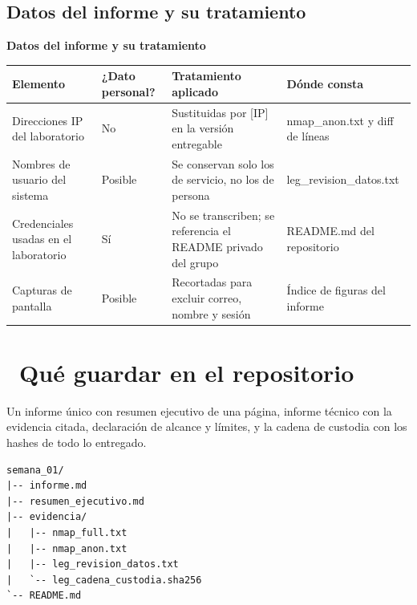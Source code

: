 \documentclass[11pt,a4paper]{article}
\newcommand{\iconotexto}[2]{\textcolor{cyanNeon}{\faIcon{#1}}~#2}
\begin{document}
\subsection{Datos del informe y su tratamiento}

\begin{center}
\begin{minipage}{\linewidth}
\centering
{\footnotesize
\textbf{Datos del informe y su tratamiento}\par\smallskip
\begin{tabular}{@{}>{\raggedright\arraybackslash}p{3.55cm}>{\raggedright\arraybackslash}p{3.55cm}>{\raggedright\arraybackslash}p{3.55cm}>{\raggedright\arraybackslash}p{3.55cm}@{}}
\toprule
\textbf{Elemento} & \textbf{¿Dato personal?} & \textbf{Tratamiento aplicado} & \textbf{Dónde consta} \\
\midrule
Direcciones IP del laboratorio & No & Sustituidas por [IP] en la versión entregable & nmap\_anon.txt y diff de líneas \\
Nombres de usuario del sistema & Posible & Se conservan solo los de servicio, no los de persona & leg\_revision\_datos.txt \\
Credenciales usadas en el laboratorio & Sí & No se transcriben; se referencia el README privado del grupo & README.md del repositorio \\
Capturas de pantalla & Posible & Recortadas para excluir correo, nombre y sesión & Índice de figuras del informe \\
\bottomrule
\end{tabular}
}
\par{}
\end{minipage}
\end{center}

\section{\iconotexto{box-open}{Qué guardar en el repositorio}}

Un informe único con resumen ejecutivo de una página, informe técnico con la evidencia citada, declaración de alcance y límites, y la cadena de custodia con los hashes de todo lo entregado.

\begin{lstlisting}[style=estiloCodigo]
semana_01/
|-- informe.md
|-- resumen_ejecutivo.md
|-- evidencia/
|   |-- nmap_full.txt
|   |-- nmap_anon.txt
|   |-- leg_revision_datos.txt
|   `-- leg_cadena_custodia.sha256
`-- README.md
\end{lstlisting}
\end{document}
